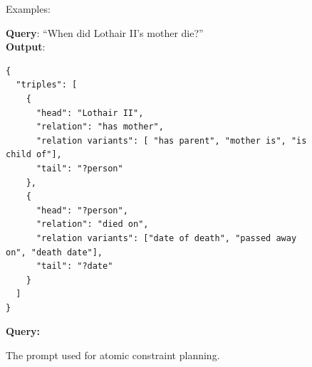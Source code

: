 \documentclass{article}
\theoremstyle{plain}
\theoremstyle{definition}
\theoremstyle{remark}
\begin{document}
\begin{figure}[ht]
\begin{fullwidthprompt}
\vspace{0.3em}
Examples:
\vspace{0.3em}

\textbf{Query}: ``When did Lothair II's mother die?''\\
\textbf{Output}:{\footnotesize
\begin{verbatim}
{
  "triples": [
    {
      "head": "Lothair II",
      "relation": "has mother",
      "relation variants": [ "has parent", "mother is", "is child of"],
      "tail": "?person"
    },
    {
      "head": "?person",
      "relation": "died on",
      "relation variants": ["date of death", "passed away on", "death date"],
      "tail": "?date"
    }
  ]
}
\end{verbatim}
}
\textbf{Query:}
    \end{fullwidthprompt}
    \caption{The prompt used for atomic constraint planning.}
    \label{fig:prompt_query_decomposition}
\end{figure}
\end{document}
